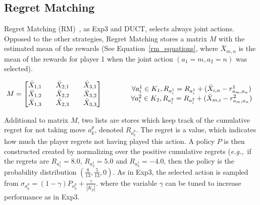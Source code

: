 \documentclass{article}
\newcommand{\eg}{{\it e.g.,}~}
\begin{document}


\subsection{Regret Matching}
\label{subsec:rm}
Regret Matching (RM)~\cite{Hart00}, as Exp3 and DUCT, selects always joint actions. Opposed to the other strategies, Regret Matching stores a matrix $M$ with the estimated mean of the rewards (See Equation~\ref{rm_equations}, where $\bar{X}_{m,n}$ is the mean of the rewards for player 1 when the joint action $(a_{1}=m,a_{2}=n)$ was selected).

\begin{equation}
\label{rm_equations}
M = 
\begin{bmatrix}
\bar{X}_{1,1} && \bar{X}_{2,1} && \bar{X}_{3,1} \\
\bar{X}_{1,2} && \bar{X}_{2,2} && \bar{X}_{3,2} \\
\bar{X}_{1,3} && \bar{X}_{2,3} && \bar{X}_{3,3}
\end{bmatrix}
\mbox{ \hspace{1cm} }
\begin{array}{c}
\forall a^{1}_{i} \in K_{1}, R_{a^{1}_{i}} = R_{a^{1}_{i}} + (\bar{X}_{i,n} - r^{1}_{a_{m},a_{n}})\\
\forall a^{2}_{i} \in K_{2}, R_{a^{2}_{i}} = R_{a^{2}_{i}} + (\bar{X}_{m,i} - r^{2}_{a_{m},a_{n}})
\end{array}
\end{equation}

Additional to matrix $M$, two lists are stores which keep track of the cumulative regret for not taking move $a^p_k$, denoted $R_{a^{p}_{k}}$.
The regret is a value, which indicates how much the player regrets not having played this action. 
A policy $P$ is then constructed created by normalizing over the positive cumulative regrets (\eg if the regrets are $R_{a^{1}_{1}} = 8.0$, $R_{a^{1}_{2}} = 5.0$ and $R_{a^{1}_{3}} = -4.0$, then the policy is the probability distribution $(\frac{8}{13}, \frac{5}{13}, 0)$. 
As in Exp3, the selected action is sampled from $\sigma_{a^{p}_{k}}=(1-\gamma) P_{a^{p}_{k}} + \frac{\gamma}{|K_{p}|}$. 
where the variable $\gamma$ can be tuned to increase performance as in Exp3.

\end{document}
